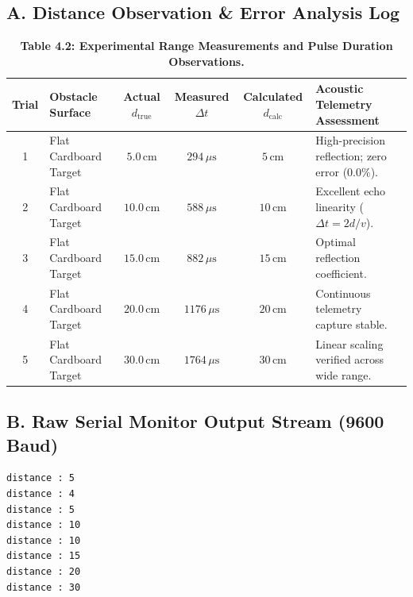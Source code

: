 \documentclass[10pt,a4paper]{article}
\begin{document}
\subsection*{A. Distance Observation \& Error Analysis Log}
\begin{table}[H]
\centering
\footnotesize
\renewcommand{\arraystretch}{1.15}
\begin{tabularx}{\textwidth}{|c|p{3.2cm}|c|c|c|X|}
\hline
\textbf{Trial} & \textbf{Obstacle Surface} & \textbf{Actual $d_{\text{true}}$} & \textbf{Measured $\Delta t$} & \textbf{Calculated $d_{\text{calc}}$} & \textbf{Acoustic Telemetry Assessment} \\
\hline
1 & Flat Cardboard Target & $5.0\,\text{cm}$ & $294\,\mu\text{s}$ & $5\,\text{cm}$ & High-precision reflection; zero error ($0.0\%$). \\
2 & Flat Cardboard Target & $10.0\,\text{cm}$ & $588\,\mu\text{s}$ & $10\,\text{cm}$ & Excellent echo linearity ($\Delta t = 2d/v$). \\
3 & Flat Cardboard Target & $15.0\,\text{cm}$ & $882\,\mu\text{s}$ & $15\,\text{cm}$ & Optimal reflection coefficient. \\
4 & Flat Cardboard Target & $20.0\,\text{cm}$ & $1176\,\mu\text{s}$ & $20\,\text{cm}$ & Continuous telemetry capture stable. \\
5 & Flat Cardboard Target & $30.0\,\text{cm}$ & $1764\,\mu\text{s}$ & $30\,\text{cm}$ & Linear scaling verified across wide range. \\
\hline
\end{tabularx}
\caption{\textbf{Table 4.2: Experimental Range Measurements and Pulse Duration Observations.}}
\end{table}

\subsection*{B. Raw Serial Monitor Output Stream (9600 Baud)}
\begin{lstlisting}[style=bwTerminal]
distance : 5
distance : 4
distance : 5
distance : 10
distance : 10
distance : 15
distance : 20
distance : 30
\end{lstlisting}

\newpage

\end{document}
